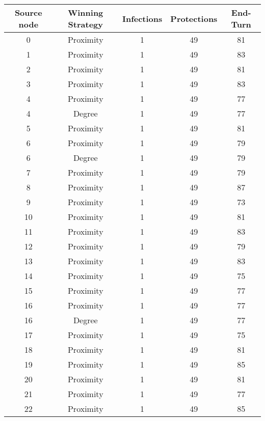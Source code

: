 \documentclass[results.tex]{subfiles}
\begin{document}
\begin{center}
  \begin{tabular}{| c || c | c | c | c |}
    \hline
    {\bfseries Source node} & {\bfseries Winning Strategy} & {\bfseries Infections} & {\bfseries Protections} & {\bfseries End-Turn} \\  %
    \hline\hline
    0 & Proximity & 1 & 49 & 81 \\ 
    \hline
    1 & Proximity & 1 & 49 & 83 \\ 
    \hline
    2 & Proximity & 1 & 49 & 81 \\ 
    \hline
    3 & Proximity & 1 & 49 & 83 \\ 
    \hline
    4 & Proximity & 1 & 49 & 77 \\ 
    \hline
    4 & Degree & 1 & 49 & 77 \\ 
    \hline
    5 & Proximity & 1 & 49 & 81 \\ 
    \hline
    6 & Proximity & 1 & 49 & 79 \\ 
    \hline
    6 & Degree & 1 & 49 & 79 \\ 
    \hline
    7 & Proximity & 1 & 49 & 79 \\ 
    \hline
    8 & Proximity & 1 & 49 & 87 \\ 
    \hline
    9 & Proximity & 1 & 49 & 73 \\ 
    \hline
    10 & Proximity & 1 & 49 & 81 \\ 
    \hline
    11 & Proximity & 1 & 49 & 83 \\ 
    \hline
    12 & Proximity & 1 & 49 & 79 \\ 
    \hline
    13 & Proximity & 1 & 49 & 83 \\ 
    \hline
    14 & Proximity & 1 & 49 & 75 \\ 
    \hline
    15 & Proximity & 1 & 49 & 77 \\ 
    \hline
    16 & Proximity & 1 & 49 & 77 \\ 
    \hline
    16 & Degree & 1 & 49 & 77 \\ 
    \hline
    17 & Proximity & 1 & 49 & 75 \\ 
    \hline
    18 & Proximity & 1 & 49 & 81 \\ 
    \hline
    19 & Proximity & 1 & 49 & 85 \\ 
    \hline
    20 & Proximity & 1 & 49 & 81 \\ 
    \hline
    21 & Proximity & 1 & 49 & 77 \\ 
    \hline
    22 & Proximity & 1 & 49 & 85 \\ 

\end{tabular}
\end{center}
\end{document}
